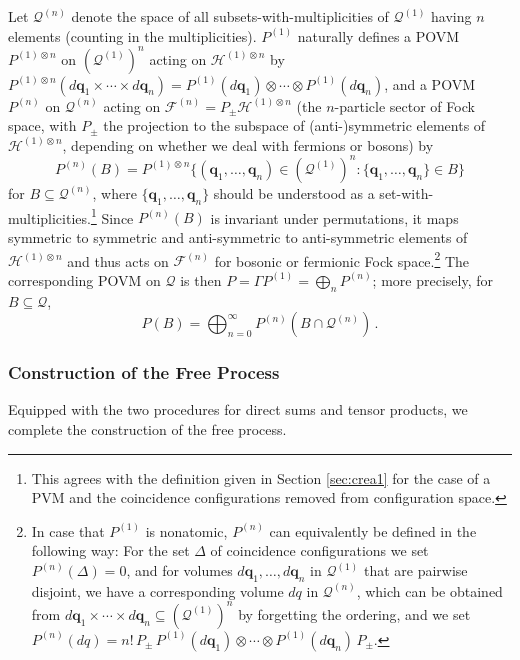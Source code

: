 \documentclass[12pt]{article}
\newcommand{\1}{\mathbf{1}} %
\newcommand{\Hilbert}{\mathscr{H}}
\newcommand{\Fock}{\mathscr{F}} %
\newcommand{\conf}{\mathcal{Q}} %
\newcommand{\pov}{{P}}%
\newcommand{\vq}{{\boldsymbol q}}
\begin{document}
Let $\conf^{(n)}$ denote the space of all subsets-with-multiplicities
of $\conf^{(1)}$ having $n$ elements (counting in the multiplicities).
$\pov^{(1)}$ naturally defines a POVM $\pov^{(1)\otimes n}$ on
$(\conf^{(1)})^n$ acting on $\Hilbert^{(1)\otimes n}$ by
$\pov^{(1)\otimes n}(d\vq_1 \times \cdots \times d\vq_n) =
\pov^{(1)}(d\vq_1) \otimes \cdots \otimes \pov^{(1)}(d\vq_n)$, and a
POVM $\pov^{(n)}$ on $\conf^{(n)}$ acting on $\Fock^{(n)} = P_\pm
\Hilbert^{(1)\otimes n}$ (the $n$-particle sector of Fock space, with
$P_\pm$ the projection to the subspace of (anti\nobreakdash-)symmetric
elements of $\Hilbert^{(1)\otimes n}$, depending on whether we deal
with fermions or bosons) by
\[
   \pov^{(n)}(B) = \pov^{(1)\otimes n} \big\{(\vq_1, \ldots, \vq_n)
   \in (\conf^{(1)})^n : \{\vq_1, \ldots, \vq_n\} \in B \big\}
\]
for $B \subseteq \conf^{(n)}$, where $\{\vq_1, \ldots, \vq_n\}$ should
be understood as a set-with-multiplicities.\footnote{This agrees with
the definition given in Section \ref{sec:crea1} for the case of a PVM
and the coincidence configurations removed from configuration space.}
Since $\pov^{(n)}(B)$ is invariant under permutations, it maps
symmetric to symmetric and anti-symmetric to anti-symmetric elements
of $\Hilbert^{(1)\otimes n}$ and thus acts on $\Fock^{(n)}$ for
bosonic or fermionic Fock space.\footnote{In case that $\pov^{(1)}$ is
nonatomic, $\pov^{(n)}$ can equivalently be defined in the following
way: For the set $\Delta$ of coincidence configurations we set
$\pov^{(n)}(\Delta) =0$, and for volumes $d\vq_1, \ldots, d\vq_n$ in
$\conf^{(1)}$ that are pairwise disjoint, we have a corresponding
volume $dq$ in $\conf^{(n)}$, which can be obtained from $d\vq_1
\times \cdots \times d\vq_n \subseteq (\conf^{(1)})^n$ by forgetting
the ordering, and we  set $\pov^{(n)}(dq) = n! \, P_\pm \,
\pov^{(1)}(d\vq_1) \otimes \cdots \otimes \pov^{(1)}(d\vq_n) \,
P_\pm$.} The corresponding POVM on $\conf$ is then $\pov = \Gamma
\pov^{(1)} = \bigoplus_n \pov^{(n)}$; more precisely, for $B \subseteq
\conf$,
\[
   \pov(B) = \bigoplus_{n=0}^\infty \pov^{(n)} (B\cap \conf^{(n)})\,.
\]


\subsubsection{Construction of the Free Process}

Equipped with the two procedures for direct sums and tensor products,
we complete the construction of the free process.
\end{document}
